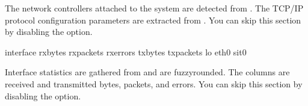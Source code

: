 \documentclass[letterpaper,10pt,english]{sphinxmanual}
\begin{document}
The network controllers attached to the system are detected from . The
TCP/IP protocol configuration parameters are extracted from . You can skip this section by disabling the {\hyperref[\detokenize{mariadb-system-summary:cmdoption-mariadb-system-summary-summarize-network}]{}} option.

\begin{sphinxVerbatim}[commandchars=\\\{\}]
interface rx\PYGZus{}bytes rx\PYGZus{}packets rx\PYGZus{}errors tx\PYGZus{}bytes tx\PYGZus{}packets 
      
lo                                       
eth0                                      
sit0                                                           
\end{sphinxVerbatim}

Interface statistics are gathered from  and are fuzzy\sphinxhyphen{}rounded. The
columns are received and transmitted bytes, packets, and errors.  You can skip
this section by disabling the {\hyperref[\detokenize{mariadb-system-summary:cmdoption-mariadb-system-summary-summarize-network}]{}} option.
\end{document}
